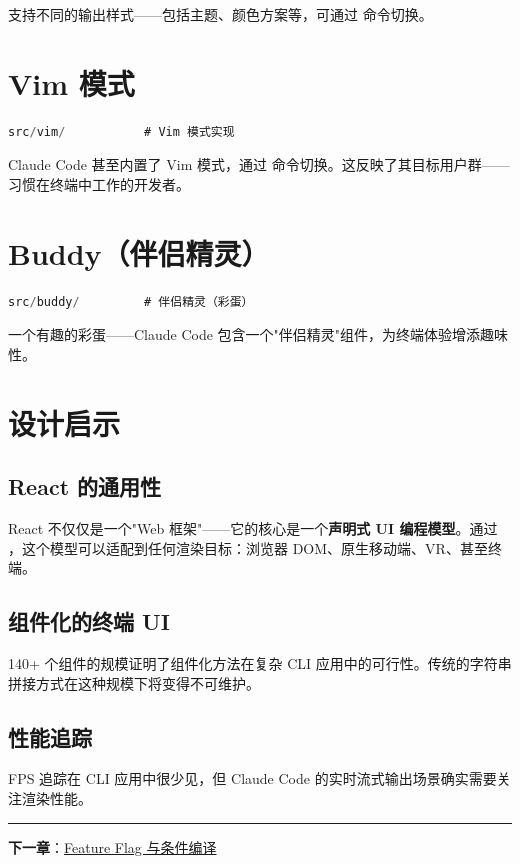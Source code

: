 支持不同的输出样式——包括主题、颜色方案等，可通过  命令切换。

\section{Vim 模式}

\begin{lstlisting}[language=TypeScript,breaklines=true]
src/vim/           # Vim 模式实现
\end{lstlisting}

Claude Code 甚至内置了 Vim 模式，通过  命令切换。这反映了其目标用户群——习惯在终端中工作的开发者。

\section{Buddy（伴侣精灵）}

\begin{lstlisting}[language=TypeScript,breaklines=true]
src/buddy/         # 伴侣精灵（彩蛋）
\end{lstlisting}

一个有趣的彩蛋——Claude Code 包含一个"伴侣精灵"组件，为终端体验增添趣味性。

\section{设计启示}

\subsection{React 的通用性}

React 不仅仅是一个"Web 框架"——它的核心是一个\textbf{声明式 UI 编程模型}。通过 ，这个模型可以适配到任何渲染目标：浏览器 DOM、原生移动端、VR、甚至终端。

\subsection{组件化的终端 UI}

140+ 个组件的规模证明了组件化方法在复杂 CLI 应用中的可行性。传统的字符串拼接方式在这种规模下将变得不可维护。

\subsection{性能追踪}

FPS 追踪在 CLI 应用中很少见，但 Claude Code 的实时流式输出场景确实需要关注渲染性能。

\bigskip\noindent\rule{\textwidth}{0.4pt}\bigskip

\textbf{下一章}：\href{./chapter-13-feature-flags.md}{Feature Flag 与条件编译}
